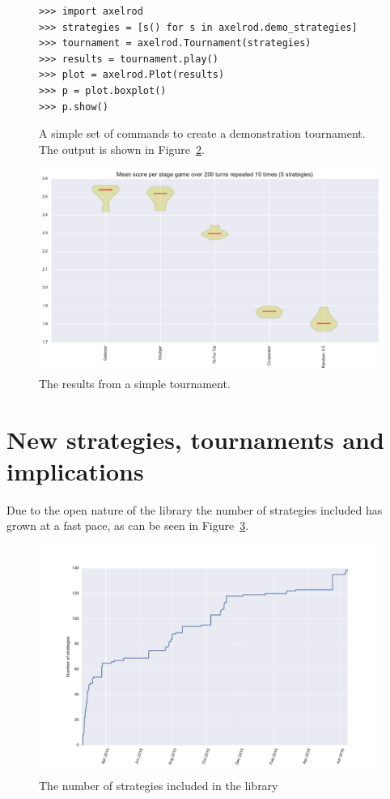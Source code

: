 \documentclass{jors}
\begin{document}
\begin{figure}[!hbtp]
    \begin{verbatim}
>>> import axelrod
>>> strategies = [s() for s in axelrod.demo_strategies]
>>> tournament = axelrod.Tournament(strategies)
>>> results = tournament.play()
>>> plot = axelrod.Plot(results)
>>> p = plot.boxplot()
>>> p.show()
    \end{verbatim}
    \caption{A simple set of commands to create a demonstration tournament. The
        output is shown in Figure~\ref{fig:demo_tournament}.}
    \label{fig:demo_tournament_commands}
\end{figure}

\begin{figure}[!hbtp]
	\centering
	\includegraphics[width=.75\textwidth]{demo_tournament.pdf}
	\caption{The results from a simple tournament.}
	\label{fig:demo_tournament}
\end{figure}

\section*{New strategies, tournaments and implications}\label{sec:new-strategies-and-implications}

Due to the open nature of the library the number of strategies included has
grown at a fast pace, as can be seen in
Figure~\ref{fig:number_of_strategies_against_date}.

\begin{figure}[!hbtp]
	\centering
	\includegraphics[width=.75\textwidth]{number_of_strategies.pdf}
	\caption{The number of strategies included in the library}
	\label{fig:number_of_strategies_against_date}
\end{figure}
\end{document}
